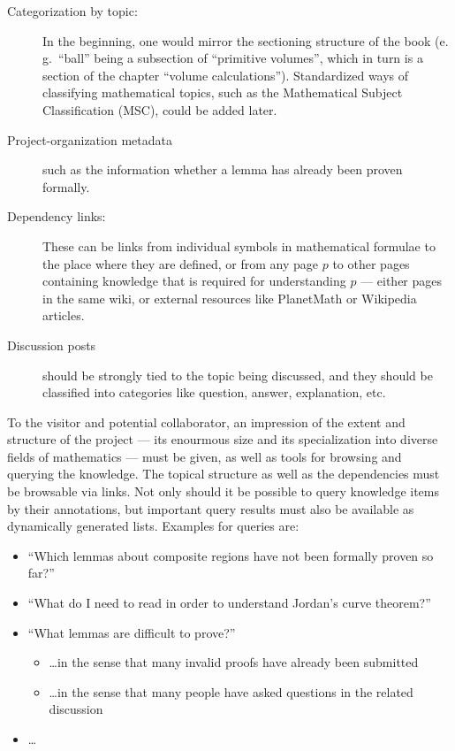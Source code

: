 \documentclass{llncs}
\begin{document}
\begin{description}
\item[Categorization by topic:] In the beginning, one would mirror the sectioning structure
  of the book (e.\,g.\ ``ball'' being a subsection of ``primitive volumes'', which in turn
  is a section of the chapter ``volume calculations'').  Standardized ways of classifying
  mathematical topics, such as the Mathematical Subject Classification
  (MSC), could be added later.
\item[Project-organization metadata] such as the information whether a lemma has already
  been proven formally.
\item[Dependency links:] These can be links from individual symbols in mathematical
  formulae to the place where they are defined, or from any page $p$ to other pages
  containing knowledge that is required for understanding $p$ --- either pages in the same
  wiki, or external resources like PlanetMath or Wikipedia articles.
\item[Discussion posts] should be strongly tied to the topic being discussed, and they
  should be classified into categories like question, answer, explanation,
  etc.
\end{description}

To the visitor and potential collaborator, an impression of the extent and structure of
the project --- its enourmous size and its specialization into diverse fields of
mathematics --- must be given, as well as tools for browsing and querying the knowledge.
The topical structure as well as the dependencies must be browsable via links.  Not only
should it be possible to query knowledge items by their annotations, but important query
results must also be available as dynamically generated lists.  Examples for queries are:

\begin{itemize}
\item ``Which lemmas about composite regions have not been formally proven so far?''
\item ``What do I need to read in order to understand Jordan's curve
  theorem?''
\item ``What lemmas are difficult to prove?''
  \begin{itemize}
  \item \ldots in the sense that many invalid proofs have already been submitted
  \item \ldots in the sense that many people have asked questions in the related discussion
  \end{itemize}
\item \ldots{}
\end{itemize}
\end{document}

